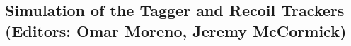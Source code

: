 
\subsection{Simulation of the Tagger and Recoil Trackers (Editors: Omar Moreno, Jeremy McCormick)}
